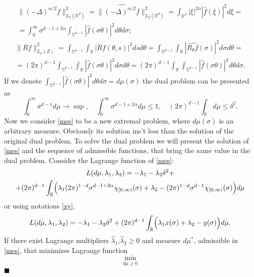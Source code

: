 \documentclass[12pt]{iopart}
\newenvironment{proof}
{\par\noindent{\bf Proof}}
{\hfill$\scriptstyle\blacksquare$}
\begin{document}
\begin{proof}
\[\]
\begin{multline*}
  \| (-\Delta)^{\alpha/2}f\|^2_{L_2(\mathbb R^d)}=\|\widehat{(-\Delta)^{\alpha/2}f}\|^2_{L_2(\mathbb R^d)}=\int_{\mathbb R^d}|\xi|^{2\alpha} |\widehat{f}(\xi)|^2d\xi=\\
  =\int_0^\infty\sigma^{d-1+2\alpha}\int_{\mathbb S^{d-1}}|\widehat{f}(\sigma\theta )|^2d\theta  d\sigma;
\end{multline*}
\begin{multline*}
  \|Rf\|^2_{L_2(Z)}=\int_{\mathbb S^{d-1}}\int_{\mathbb
    R}|Rf(\theta ,s)|^2  d sd\theta =\int_{\mathbb
    S^{d-1}}\int_{\mathbb R}|\widehat{R_\theta  f}(\sigma)|^2d\sigma
  d\theta = \\
  =(2\pi)^{d-1}\int_{\mathbb S^{d-1}}\int_{\mathbb R}|\widehat
  f(\sigma\theta )|^2d\sigma d\theta =(2\pi)^{d-1}\int_{\mathbb
    R}\int_{\mathbb S^{d-1}}|\widehat f(\sigma\theta )|^2d\theta 
  d\sigma.
\end{multline*}
If we denote $\int_{\mathbb S^{d-1}}|\widehat f(\sigma\theta )|^2 d\theta 
d\sigma=d\mu(\sigma)$ the dual problem can be presented as
  \begin{equation}
  \label{mes}
  \int_0^\infty\sigma^{d-1}d\mu\to \sup,\quad
  \int_0^\infty\sigma^{d-1+2\alpha}d\mu\leqslant  1,\quad(2\pi)^{d-1}\int_{\mathbb R}d\mu\leqslant \delta^2.
  \end{equation}
Now we consider \eqref{mes} to be a new extremal problem, where $d\mu(\sigma)$ is an arbitrary measure. Obviously its solution ins't less than the solution of the original dual problem. To solve the dual problem we will present the solution of \eqref{mes} and the sequence of admissible functions, that bring the same value in the dual problem.
Consider the Lagrange function of \eqref{mes}:
 \begin{multline*}
L(d\mu ,\lambda_1,\lambda_2)=-\lambda_1-\lambda_2\delta^2+\\
  +(2\pi)^{d-1}\int_{\mathbb R}\Bigl(\lambda_1(2\pi)^{1-d}\sigma^{d-1+2\alpha}\chi_{[0,\infty)}(\sigma)+\lambda_2-(2\pi)^{1-d}\sigma^{d-1}\chi_{[0,\infty)}(\sigma)\Bigr)d\mu
\end{multline*}
or using notations \eqref{xy},
 $$
L(d\mu ,\lambda_1,\lambda_2)=-\lambda_1-\lambda_2\delta^2+(2\pi)^{d-1}\int_{\mathbb R}\Bigl(\lambda_1x(\sigma)+\lambda_2-y(\sigma)\Bigr)d\mu.
$$
If there exist Lagrange multipliers $\widehat\lambda_1$,$\widehat\lambda_2\ge 0$ and measure $d\mu^*$, admissible in \eqref{mes}, that minimizes Lagrange function
	$$\min_{
\begin{smallmatrix}
d\mu\ge 0

\end{smallmatrix}}$$
\end{proof}
\end{document}
